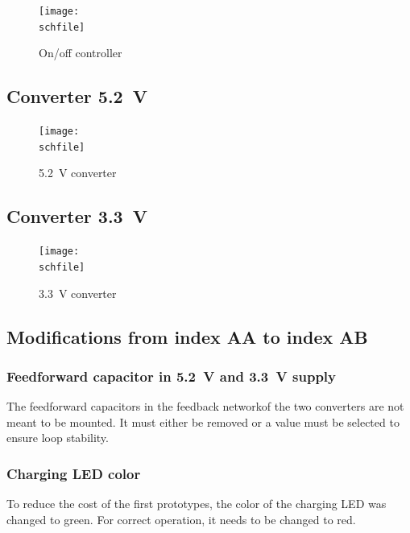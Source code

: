 \begin{figure}[h!]
    \centering
    \texttt{[image: \\schfile]}
    \caption{On/off controller}
    \label{fig_onoff}
\end{figure}

\FloatBarrier

\subsection{Converter \qty{5.2}{\volt}}
\label{sec_power_5V2}

\begin{figure}[h!]
    \centering
    \texttt{[image: \\schfile]}
    \caption{\qty{5.2}{\volt} converter}
    \label{fig_power_5V2}
\end{figure}

\FloatBarrier

\subsection{Converter \qty{3.3}{\volt}}
\label{sec_power_3V3}

\begin{figure}[h!]
    \centering
    \texttt{[image: \\schfile]}
    \caption{\qty{3.3}{\volt} converter}
    \label{fig_power_3V3}
\end{figure}

\FloatBarrier

\subsection{Modifications from index AA to index AB}

\subsubsection{Feedforward capacitor in \qty{5.2}{\volt} and \qty{3.3}{\volt} supply}
The feedforward capacitors in the feedback networkof the two converters are not meant to be mounted. It must either be removed or a value must be selected to ensure loop stability. 

\subsubsection{Charging LED color}
To reduce the cost of the first prototypes, the color of the charging \ac{LED} was changed to green. For correct operation, it needs to be changed to red. 

